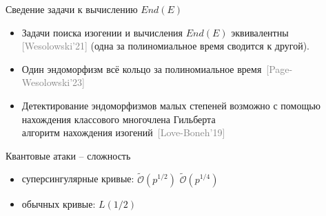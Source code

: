 \documentclass{beamer}
\begin{document}



\begin{frame}{Сведение задачи к вычислению $End(E)$}
	\begin{itemize}
		\item Задачи поиска изогении и вычисления $End(E)$ эквивалентны \textcolor{gray}{[Wesolowski'21]} (одна за полиномиальное время сводится к другой).
		\vspace{0.5em}
		
		\item Один эндоморфизм \structure{$\implies$} всё кольцо за полиномиальное время~\textcolor{gray}{[Page-Wesolowski'23]}
		\vspace{0.5em}
		
		\item Детектирование эндоморфизмов малых степеней возможно с помощью нахождения классового многочлена Гильберта\\
		\structure{$\implies$} алгоритм нахождения изогений~\textcolor{gray}{[Love-Boneh'19]}
	\end{itemize}
\end{frame}

\begin{frame}{Квантовые атаки -- сложность}
	\begin{itemize}
		\item суперсингулярные кривые: $\widetilde{\mathcal{O}}(p^{1/2})$ \structure{$\implies$} $\widetilde{\mathcal{O}}(p^{1/4})$
		\vspace{0.5em}
		\item обычных кривые: $L(1/2)$
	\end{itemize}
\end{frame}

\end{document}
